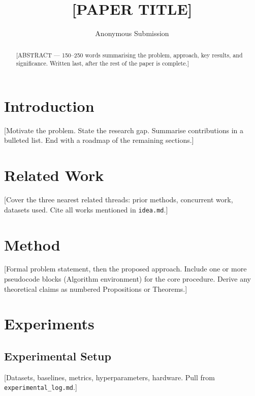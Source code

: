 \documentclass[10pt]{article}
\begin{document}
\title{[PAPER TITLE]}
\author{Anonymous Submission}
\date{}
\maketitle

\begin{abstract}
[ABSTRACT — 150–250 words summarising the problem, approach, key results,
and significance. Written last, after the rest of the paper is complete.]
\end{abstract}

\section{Introduction}
\label{sec:introduction}

[Motivate the problem. State the research gap. Summarise contributions in a
bulleted list. End with a roadmap of the remaining sections.]

\section{Related Work}
\label{sec:related}

[Cover the three nearest related threads: prior methods, concurrent work,
datasets used. Cite all works mentioned in \texttt{idea.md}.]

\section{Method}
\label{sec:method}

[Formal problem statement, then the proposed approach. Include one or more
pseudocode blocks (Algorithm environment) for the core procedure. Derive
any theoretical claims as numbered Propositions or Theorems.]

\section{Experiments}
\label{sec:experiments}

\subsection{Experimental Setup}
[Datasets, baselines, metrics, hyperparameters, hardware. Pull from
\texttt{experimental\_log.md}.]
\end{document}
